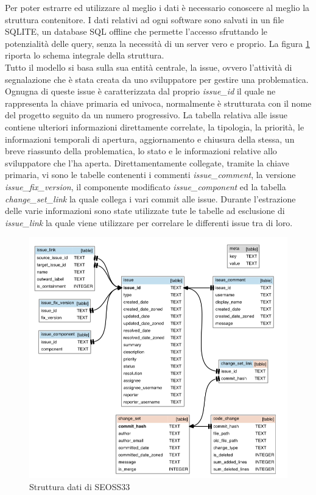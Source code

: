 \documentclass[%
    corpo=12pt,
    twoside,
    oldstyle,
    autoretitolo,
    greek,
    evenboxes,
]{toptesi}
\begin{document}
Per poter estrarre ed utilizzare al meglio i dati è necessario conoscere al meglio la struttura contenitore.
I dati relativi ad ogni software sono salvati in un file SQLITE, un database SQL offline che permette l'accesso sfruttando le potenzialità delle query, senza la necessità di un server vero e proprio. La figura \ref{fig:seoss33_db} riporta lo schema integrale della struttura.\\
Tutto il modello si basa sulla sua entità centrale, la issue, ovvero l'attività di segnalazione che è stata creata da uno sviluppatore per gestire una problematica. Ognugna di queste issue è caratterizzata dal proprio \textit{issue\_id} il quale ne rappresenta la chiave primaria ed univoca, normalmente è strutturata con il nome del progetto seguito da un numero progressivo. La tabella relativa alle issue contiene ulteriori informazioni direttamente correlate, la tipologia, la priorità, le informazioni temporali di apertura, aggiornamento e chiusura della stessa, un breve riassunto della problematica, lo stato e le informazioni relative allo sviluppatore che l'ha aperta. Direttamentamente collegate, tramite la chiave primaria, vi sono le tabelle contenenti i commenti \textit{issue\_comment}, la versione \textit{issue\_fix\_version}, il componente modificato \textit{issue\_component} ed la tabella \textit{change\_set\_link} la quale collega i vari commit alle issue. Durante l'estrazione delle varie informazioni sono state utilizzate tute le tabelle ad esclusione di \textit{issue\_link} la quale viene utilizzare per correlare le differenti issue tra di loro.

\begin{figure}[!ht]
  \includegraphics[width=\linewidth]{figure/seoss33_db_schema.png}
  \caption{Struttura dati di SEOSS33}
  \label{fig:seoss33_db}
\end{figure}
\end{document}

